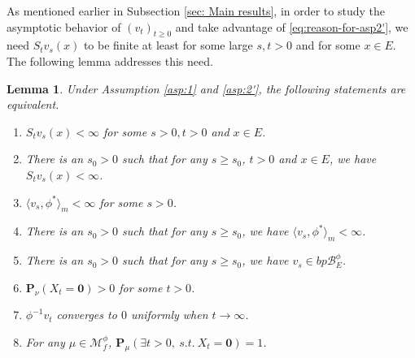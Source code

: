 \documentclass[UTF8]{pkuthss}
\theoremstyle{plain}
\newtheorem{lem}[thm]{Lemma}
\theoremstyle{definition}
\numberwithin{equation}{section}
\begin{document}
	As mentioned earlier in Subsection \ref{sec: Main results}, in order to study the asymptotic behavior of $(v_t)_{t\geq 0}$ and take advantage of \eqref{eq:reason-for-asp2'}, we need $S_t v_s(x)$ to be finite  at least for some large $s,t>0$ and for some $x\in E$.
	The following lemma addresses this need.

\begin{lem}\label{lem:discuss-of-assumption2'}
 Under Assumption \ref{asp:1} and \ref{asp:2'}, the following statements are equivalent.
\begin{enumerate}
\item[$(1)$]
	$S_tv_s(x)<\infty$ for some $s>0,t>0$ and $x\in E$.
\item[$(1')$]
	There is an $s_0>0$ such that for any $s\geq s_0$, $t>0$ and $x\in E$, we have $S_tv_s(x)<\infty$.
\item[$(2)$]
	$ \langle v_s, \phi^* \rangle_m < \infty$ for some $s>0$.
\item[$(2')$]
	There is an $s_0>0$ such that for any $s\geq s_0$, we have $\langle v_s, \phi^* \rangle_m < \infty$.
\item[$(3)$]
	There is an $s_0>0$ such that for any $s\geq s_0$, we have $v_s\in bp\mathscr B^\phi_E$.
\item[$(4)$]
	$\mathbf P_\nu (X_t = \mathbf 0) > 0$ for some $t>0$.
\item[$(5)$]
	$\phi^{-1}v_t$ converges to $0$ uniformly when $t\to\infty$.
\item[$(6)$]
	For any $\mu \in \mathcal M^\phi_f$, $\mathbf P_\mu(\exists t>0,~s.t.~X_t = \mathbf 0)
	= 1$.
\end{enumerate}
\end{lem}
\end{document}

